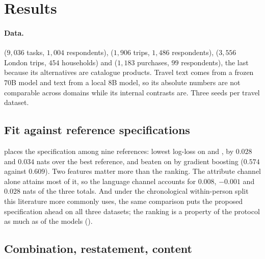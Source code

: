\section{Results}
\label{sec:results}

\paragraph{Data.}  ($9{,}036$ tasks, $1{,}004$ respondents),
 ($1{,}906$ trips, $1{,}486$ respondents),  ($3{,}556$ London
trips, $454$ households) and  ($1{,}183$ purchases, $99$ respondents), the
last because its alternatives are catalogue products. Travel text comes from a frozen $70$B
model and  text from a local $8$B model, so its absolute numbers are not
comparable across domains while its internal contrasts are. Three seeds per travel dataset.

\subsection{Fit against reference specifications}

\begin{table}[t]
\caption{Test negative log-likelihood, respondent-disjoint partitions, three seeds. Every
specification is fitted on identical partitions with the same attributes, the same person
covariates and the same two history variables; the ICLV model is estimated only where
attitudinal indicators exist.}
\label{tab:benchmarks}
\centering\small

\end{table}

 places the specification among nine references: lowest log-loss on
 and , by $0.028$ and $0.034$ nats over the best reference, and
beaten on  by gradient boosting ($0.574$ against $0.609$). Two features
matter more than the ranking. The attribute channel alone attains most of it, so the language
channel accounts for $0.008$, $-0.001$ and $0.028$ nats of the three totals. And under the
chronological within-person split this literature more commonly uses, the same comparison puts
the proposed specification ahead on all three datasets; the ranking is a property of the
protocol as much as of the models ().

\subsection{Combination, restatement, content}

